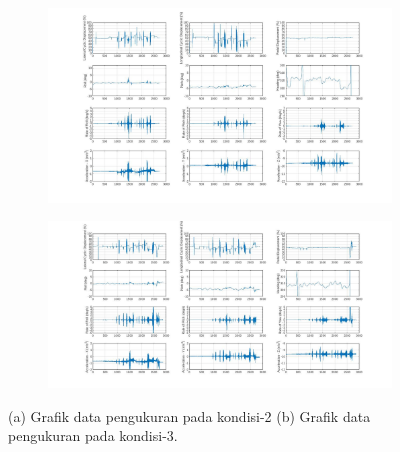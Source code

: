 \begin{figure}[H]
	\begin{subfigure}{0.49\textwidth}
		\centering
		\includegraphics[width=\linewidth]{gambar/Condition_2.jpg}
		\caption{}
		\label{fig:condition_2}
	\end{subfigure}
	\centering
	\begin{subfigure}{0.51\textwidth}
		\centering
		\includegraphics[width=\linewidth]{gambar/Condition_3.jpg}
		\caption{}
		\label{fig:condition_3}
	\end{subfigure}
	\caption{(a) Grafik data pengukuran pada kondisi-2 (b) Grafik data pengukuran pada kondisi-3.}
\end{figure}

